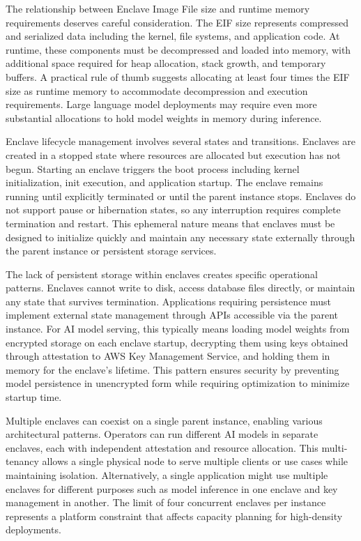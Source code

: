 The relationship between Enclave Image File size and runtime memory requirements deserves careful consideration. The EIF size represents compressed and serialized data including the kernel, file systems, and application code. At runtime, these components must be decompressed and loaded into memory, with additional space required for heap allocation, stack growth, and temporary buffers. A practical rule of thumb suggests allocating at least four times the EIF size as runtime memory to accommodate decompression and execution requirements. Large language model deployments may require even more substantial allocations to hold model weights in memory during inference.

Enclave lifecycle management involves several states and transitions. Enclaves are created in a stopped state where resources are allocated but execution has not begun. Starting an enclave triggers the boot process including kernel initialization, init execution, and application startup. The enclave remains running until explicitly terminated or until the parent instance stops. Enclaves do not support pause or hibernation states, so any interruption requires complete termination and restart. This ephemeral nature means that enclaves must be designed to initialize quickly and maintain any necessary state externally through the parent instance or persistent storage services.

The lack of persistent storage within enclaves creates specific operational patterns. Enclaves cannot write to disk, access database files directly, or maintain any state that survives termination. Applications requiring persistence must implement external state management through APIs accessible via the parent instance. For AI model serving, this typically means loading model weights from encrypted storage on each enclave startup, decrypting them using keys obtained through attestation to AWS Key Management Service, and holding them in memory for the enclave's lifetime. This pattern ensures security by preventing model persistence in unencrypted form while requiring optimization to minimize startup time.

Multiple enclaves can coexist on a single parent instance, enabling various architectural patterns. Operators can run different AI models in separate enclaves, each with independent attestation and resource allocation. This multi-tenancy allows a single physical node to serve multiple clients or use cases while maintaining isolation. Alternatively, a single application might use multiple enclaves for different purposes such as model inference in one enclave and key management in another. The limit of four concurrent enclaves per instance represents a platform constraint that affects capacity planning for high-density deployments.


